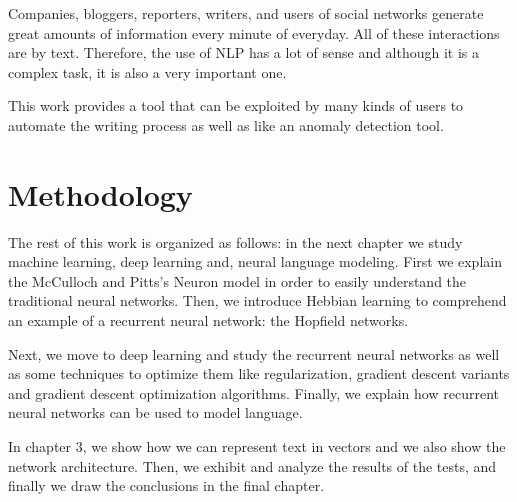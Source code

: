 Companies, bloggers, reporters, writers, and users of  social networks generate great amounts of information every minute of everyday. All of these interactions are by text. Therefore, the use of NLP has a lot of sense and although it is a complex task, it is also a very important one.

This work provides a tool that can be exploited by many kinds of users to automate the writing process as well as like an anomaly detection tool.




\section{Methodology}
The rest of this work is organized as follows: in the next chapter we study machine learning, deep learning and, neural language modeling. First we explain the McCulloch and Pitts's Neuron model in order to easily understand the traditional neural networks. Then, we introduce Hebbian learning to comprehend an example of a recurrent neural network: the Hopfield networks.

Next, we move to deep learning and study the recurrent neural networks as well as some techniques to optimize them like regularization, gradient descent variants and gradient descent optimization algorithms. Finally, we explain how recurrent neural networks can be used to model language. 

In  chapter 3, we show how we can represent text  in vectors and we also show the network architecture. Then, we exhibit and analyze  the results of the tests, and finally we draw the conclusions in the final chapter.

